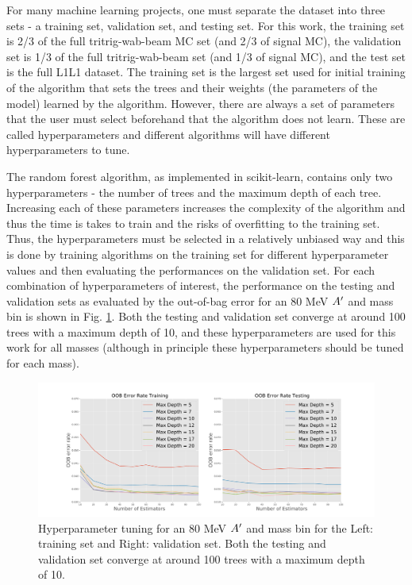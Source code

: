 For many machine learning projects, one must separate the dataset into three sets - a training set, validation set, and testing set. For this work, the training set is 2/3 of the full tritrig-wab-beam MC set (and 2/3 of signal MC), the validation set is 1/3 of the full tritrig-wab-beam set (and 1/3 of signal MC), and the test set is the full L1L1 dataset. The training set is the largest set used for initial training of the algorithm that sets the trees and their weights (the parameters of the model) learned by the algorithm. However, there are always a set of parameters that the user must select beforehand that the algorithm does not learn. These are called hyperparameters and different algorithms will have different hyperparameters to tune. 

The random forest algorithm, as implemented in scikit-learn, contains only two hyperparameters - the number of trees and the maximum depth of each tree. Increasing each of these parameters increases the complexity of the algorithm and thus the time is takes to train and the risks of overfitting to the training set. Thus, the hyperparameters must be selected in a relatively unbiased way and this is done by training algorithms on the training set for different hyperparameter values and then evaluating the performances on the validation set. For each combination of hyperparameters of interest, the performance on the testing and validation sets as evaluated by the out-of-bag error for an 80 MeV $A^\prime$ and mass bin is shown in Fig. \ref{fig:hyperparams}. Both the testing and validation set converge at around 100 trees with a maximum depth of 10, and these hyperparameters are used for this work for all masses (although in principle these hyperparameters should be tuned for each mass).

\begin{figure}[t]
    \centering
    \includegraphics[width=1.0\textwidth]{figs/Results/hyperparam.pdf}
    \caption{Hyperparameter tuning for an 80 MeV $A^\prime$ and mass bin for the Left: training set and Right: validation set. Both the testing and validation set converge at around 100 trees with a maximum depth of 10.}
    \label{fig:hyperparams}
\end{figure}

